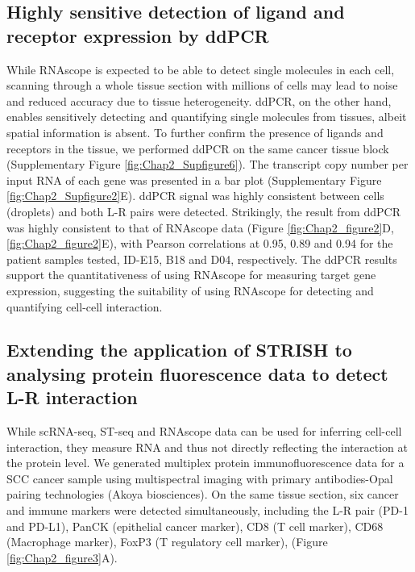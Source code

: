 \subsection{Highly sensitive detection of ligand and receptor expression by ddPCR}
While RNAscope is expected to be able to detect single molecules in each cell, scanning through a whole tissue section with millions of cells may lead to noise and reduced accuracy due to tissue heterogeneity. ddPCR, on the other hand, enables sensitively detecting and quantifying single molecules from tissues, albeit spatial information is absent. To further confirm the presence of ligands and receptors in the tissue, we performed ddPCR on the same cancer tissue block (Supplementary Figure  \ref{fig:Chap2_Supfigure6}). The transcript copy number per input RNA of each gene was presented in a bar plot (Supplementary Figure \ref{fig:Chap2_Supfigure2}E). ddPCR signal was highly consistent between cells (droplets) and both L-R pairs were detected. Strikingly, the result from ddPCR was highly consistent to that of RNAscope data (Figure \ref{fig:Chap2_figure2}D, \ref{fig:Chap2_figure2}E), with Pearson correlations at 0.95, 0.89 and 0.94 for the patient samples tested, ID-E15, B18 and D04, respectively. The ddPCR results support the quantitativeness of using RNAscope for measuring target gene expression, suggesting the suitability of using RNAscope for detecting and quantifying cell-cell interaction. 

\subsection{Extending the application of STRISH to analysing protein fluorescence data to detect L-R interaction}
While scRNA-seq, ST-seq and RNAscope data can be used for inferring cell-cell interaction, they measure RNA and thus not directly reflecting the interaction at the protein level. We generated multiplex protein immunofluorescence data for a SCC cancer sample using multispectral imaging with primary antibodies-Opal pairing technologies (Akoya biosciences). On the same tissue section, six cancer and immune markers were detected simultaneously, including the L-R pair (PD-1 and PD-L1), PanCK (epithelial cancer marker), CD8 (T cell marker), CD68 (Macrophage marker), FoxP3 (T regulatory cell marker), (Figure \ref{fig:Chap2_figure3}A). 

